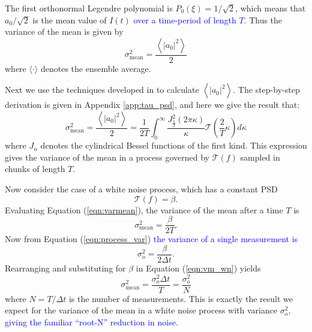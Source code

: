 \documentclass[10pt,preprint]{aastex631}
\newcommand{\jrmadd}[1]{\textcolor{blue}{#1}}
\begin{document}
The first orthonormal Legendre polynomial is $P_0(\xi) = 1/\sqrt{2}$, which means that $a_0/\sqrt{2}$ is the mean value of $I(t)$ \jrmadd{over a time-period of length $T$}.  Thus the variance of the mean is given by
\begin{equation}
\sigma_\mathrm{mean}^2 = \frac{\left\langle \left|a_0\right|^2 \right\rangle}{2}
\label{eqn:varmean_def}
\end{equation}
where $\langle \cdot \rangle$ denotes the ensemble average.   

Next we use the techniques developed in \citet{1976JOSA...66..207N} to calculate $\left\langle \left|a_0\right|^2 \right\rangle$. The step-by-step derivation is given in Appendix \ref{app:tau_psd}, and here we give the result that:
\begin{equation}
\sigma_\mathrm{mean}^2 = \frac{\left\langle \left|a_0\right|^2 \right\rangle}{2} = \frac{1}{2T}  \int_0^{\infty} \frac{ J_{\frac{1}{2}}^2(2\pi \kappa)}{\kappa} \mathcal{T}\left( \frac{2}{T} \kappa \right) d\kappa
\label{eqn:varmean}
\end{equation}
where $J_n$ denotes the cylindrical Bessel functions of the first kind.  This expression gives the variance of the mean in a process governed by $\mathcal{T}(f)$ sampled in chunks of length $T$.

Now consider the case of a white noise process, which has a constant PSD
\begin{equation}
\mathcal{T}(f) = \beta.
\end{equation}
Evaluating Equation (\ref{eqn:varmean}), the variance of the mean after a time $T$ is 
\begin{equation}
\sigma_\mathrm{mean}^2 = \frac{\beta}{2T}.
\label{eqn:vm_wn}
\end{equation}
Now from Equation (\ref{eqn:process_var}) \jrmadd{the variance of a single measurement is}
\begin{equation}
\sigma_o^2  = \frac{\beta}{2\Delta t}.
\end{equation}
Rearranging and substituting for $\beta$ in Equation (\ref{eqn:vm_wn}) yields
\begin{equation}
\sigma_\mathrm{mean}^2 =  \frac{\sigma_o^2 \Delta t}{T} = \frac{\sigma_o^2}{N}
\end{equation}
where $N = T/\Delta t$ is the number of measurements.  This is exactly the result we expect for the variance of the mean in a white noise process with variance $\sigma^2_o$, \jrmadd{giving the familiar ``root-N'' reduction in noise.}
\end{document}

